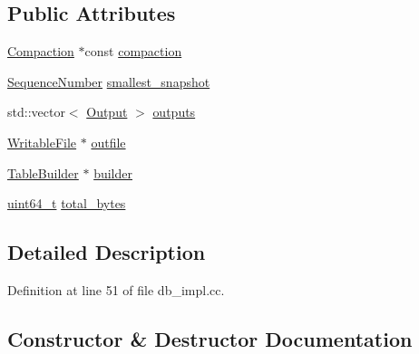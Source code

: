 \subsection*{Public Attributes}
\begin{DoxyCompactItemize}
\item 
\hyperlink{classleveldb_1_1_compaction}{Compaction} $\ast$const \hyperlink{structleveldb_1_1_d_b_impl_1_1_compaction_state_a6b92e9f2249d5977b4801bdf47afed28}{compaction}
\item 
\hyperlink{namespaceleveldb_a5481ededd221c36d652c371249f869fa}{Sequence\+Number} \hyperlink{structleveldb_1_1_d_b_impl_1_1_compaction_state_a725f0984b8372c51691d72f66672dc89}{smallest\+\_\+snapshot}
\item 
std\+::vector$<$ \hyperlink{structleveldb_1_1_d_b_impl_1_1_compaction_state_1_1_output}{Output} $>$ \hyperlink{structleveldb_1_1_d_b_impl_1_1_compaction_state_acce338739aafdfa40083ae3d5aacf24a}{outputs}
\item 
\hyperlink{classleveldb_1_1_writable_file}{Writable\+File} $\ast$ \hyperlink{structleveldb_1_1_d_b_impl_1_1_compaction_state_a4c8e3de65efc30fdf33197d544a466f9}{outfile}
\item 
\hyperlink{classleveldb_1_1_table_builder}{Table\+Builder} $\ast$ \hyperlink{structleveldb_1_1_d_b_impl_1_1_compaction_state_a5335b9d45bc03378219e3fbc366fce21}{builder}
\item 
\hyperlink{stdint_8h_aaa5d1cd013383c889537491c3cfd9aad}{uint64\+\_\+t} \hyperlink{structleveldb_1_1_d_b_impl_1_1_compaction_state_a21aa7304978dffc6841c4c11761f4b71}{total\+\_\+bytes}
\end{DoxyCompactItemize}


\subsection{Detailed Description}


Definition at line 51 of file db\+\_\+impl.\+cc.



\subsection{Constructor \& Destructor Documentation}
\hypertarget{structleveldb_1_1_d_b_impl_1_1_compaction_state_a3f66a31afd7f73ef5021337d1ec626b6}{}
